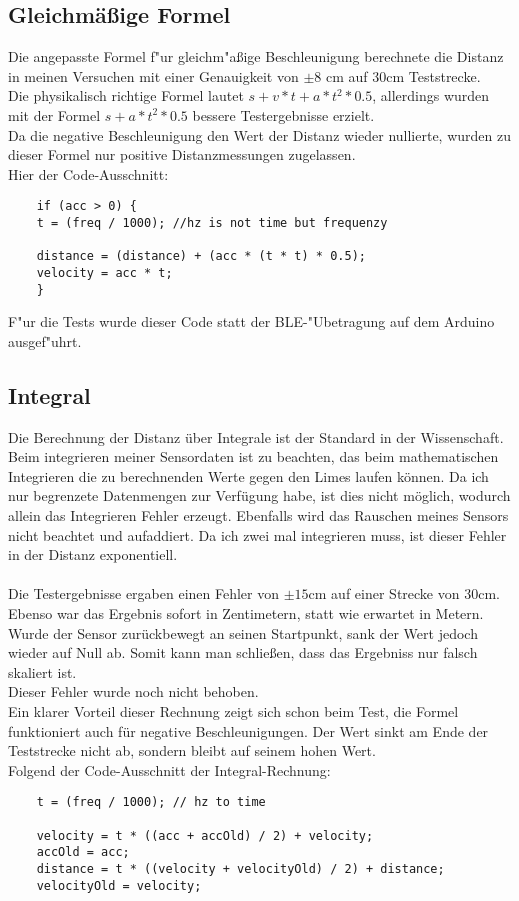 \subsection{Gleichmäßige Formel}
Die angepasste Formel f"ur gleichm"aßige Beschleunigung berechnete
die Distanz in meinen Versuchen mit einer Genauigkeit von
$\pm8$ cm auf 30cm Teststrecke.\\
Die physikalisch richtige Formel lautet 
$s + v * t  + a * t^2 * 0.5$,
allerdings wurden mit der Formel $s + a * t^2 * 0.5$ 
bessere Testergebnisse erzielt.\\
Da die negative Beschleunigung den Wert der Distanz wieder nullierte,
wurden zu dieser Formel nur positive Distanzmessungen zugelassen.\\
Hier der Code-Ausschnitt:
\begin{verbatim}
    if (acc > 0) {
    t = (freq / 1000); //hz is not time but frequenzy

    distance = (distance) + (acc * (t * t) * 0.5);
    velocity = acc * t;
    }
\end{verbatim}
F"ur die Tests wurde dieser Code statt der BLE-"Ubetragung auf dem Arduino ausgef"uhrt. 

\subsection{Integral}
Die Berechnung der Distanz über Integrale ist der Standard 
in der Wissenschaft. Beim integrieren meiner Sensordaten ist zu beachten, 
das beim mathematischen Integrieren die zu berechnenden Werte gegen den Limes 
laufen können. Da ich nur begrenzete Datenmengen zur Verfügung habe, ist dies 
nicht möglich, wodurch allein das Integrieren Fehler erzeugt. Ebenfalls wird das 
Rauschen meines Sensors nicht beachtet und aufaddiert. Da ich zwei mal integrieren 
muss, ist dieser Fehler in der Distanz exponentiell.\\
\\
Die Testergebnisse ergaben einen Fehler von $\pm15$cm auf einer Strecke
von 30cm. Ebenso war das Ergebnis sofort in Zentimetern, statt wie erwartet in Metern. 
Wurde der Sensor zurückbewegt an seinen Startpunkt, sank
der Wert jedoch wieder auf Null ab. Somit kann man schließen,
dass das Ergebniss nur falsch skaliert ist.\\
Dieser Fehler wurde noch nicht behoben. \\
Ein klarer Vorteil dieser Rechnung zeigt sich schon beim Test,
die Formel funktioniert auch für negative Beschleunigungen.
Der Wert sinkt am Ende der Teststrecke nicht ab, sondern bleibt
auf seinem hohen Wert.\\
Folgend der Code-Ausschnitt der Integral-Rechnung:
\begin{verbatim}
    t = (freq / 1000); // hz to time

    velocity = t * ((acc + accOld) / 2) + velocity;
    accOld = acc;
    distance = t * ((velocity + velocityOld) / 2) + distance;
    velocityOld = velocity;  
\end{verbatim}